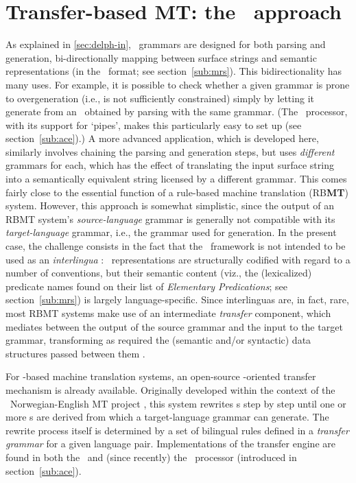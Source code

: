 
\section{Transfer-based MT: the \logon\ approach}
\label{logon}

As explained in \cref{sec:delph-in}, \delphin\ grammars are designed for both
parsing and generation, bi-directionally mapping between surface strings and
semantic representations (in the \mrs\ format; see section~\ref{sub:mrs}). This
bidirectionality has many uses. For example, it is possible to check whether a
given grammar is prone to overgeneration (i.e., is not sufficiently
constrained) simply by letting it generate from an \mrs\ obtained by parsing
with the same grammar. (The \ace\ processor, with its support for `pipes',
makes this particularly easy to set up (see section~\ref{sub:ace}).) A more
advanced application, which is developed here, similarly involves chaining the
parsing and generation steps, but uses \emph{different} grammars for each,
which has the effect of translating the input surface string into a
semantically equivalent string licensed by a different grammar. This comes
fairly close to the essential function of a rule-based machine translation
(RB\textbf{MT}) system. However, this approach is somewhat simplistic, since
the output of an RBMT system's \emph{source-language} grammar is generally not
compatible with its \emph{target-language} grammar, i.e., the grammar used for
generation. In the present case, the challenge consists in the fact that the
\mrs\ framework is not intended to be used as an \emph{interlingua}
\citep{copestake2005minimal}: \mrs\ representations are structurally codified
with regard to a number of conventions, but their semantic content (viz., the
(lexicalized) predicate names found on their list of \emph{Elementary
Predications}; see section~\ref{sub:mrs}) is largely language-specific. Since
interlinguas are, in fact, rare, most RBMT systems make use of an intermediate
\emph{transfer} component, which mediates between the output of the source
grammar and the input to the target grammar, transforming as required the
(semantic and/or syntactic) data structures passed between them
\citep{vandeghinste2008hybrid}.

For \delphin-based machine translation systems,
an open-source \mrs-oriented transfer mechanism is already available.
Originally developed within the context of the \logon\ Norwegian-English MT
project \citep{Lonning04logon.a}, this system rewrites \mrs s step by step
until one or more \mrs s are derived from which a target-language grammar can
generate. The rewrite process itself is determined by a set of bilingual rules
defined in a \emph{transfer grammar} \citep{oepen2008transfer} for a given
language pair. Implementations of the transfer engine are found in both the
\lkb\ and (since recently) the \ace\ processor (introduced in
section~\ref{sub:ace}).

